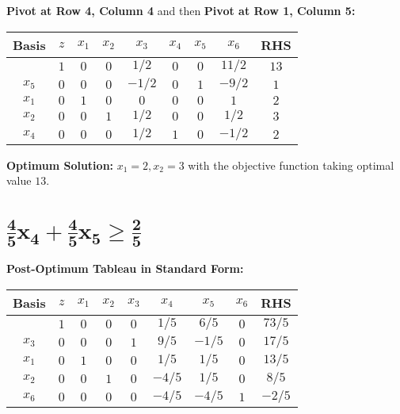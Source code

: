 \documentclass{article}[12pt,a4paper]
\begin{document}
\begin{enumerate}
  	  \noindent \textbf{Pivot at Row 4, Column 4} and then \textbf{Pivot at Row 1, Column 5:}
  	   \begin{center}
 	   \begin{tabular}{c | c | c c c c c c | c}
            		Basis & $z$ & $x_1$ & $x_2$ & $x_3$ & $x_4$ & $x_5$ & $x_6$ & RHS \\ \hline
  			           & $1$ & $0$ & $0$   & $1/2$ & $0$     & $0$ & $11/2$ & $13$  \\ \hline
  			$x_5$ & $0$ & $0$ & $0$   & $-1/2$    & $0$  & $1$ & $-9/2$ & $1$ \\
  			$x_1$ & $0$ & $1$ & $0$  &  $0$    & $0$  & $0$ & $1$ & $2$ \\
  			$x_2$ & $0$ & $0$ & $1$ &   $1/2$    & $0$ & $0$ & $1/2$ & $3$ \\
  			$x_4$ & $0$ & $0$ & $0$ &   $1/2$    & $1$ & $0$ & $-1/2$ & $2$ \\
  	  \end{tabular}
  	  \end{center}
  	  
  	  \noindent \textbf{Optimum Solution:} $x_1 = 2, x_2 = 3$ with the objective function taking optimal value $13$. 
  	  
  	  \noindent \section*{$\mathbf{\frac{4}{5}x_4 + \frac{4}{5}x_5 \ge \frac{2}{5}}$}
  	  
  	  \textbf{Post-Optimum Tableau in Standard Form:}
  	  \begin{center}
 	   \begin{tabular}{c | c | c c c c c c | c}
            		Basis & $z$ & $x_1$ & $x_2$ & $x_3$ & $x_4$ & $x_5$ & $x_6$ & RHS \\ \hline
  			           & $1$ & $0$ & $0$   & $0$ & $1/5$     & $6/5$ & $0$ & $73/5$  \\ \hline
  			$x_3$ & $0$ & $0$ & $0$   & $1$    & $9/5$  & $-1/5$ & $0$ & $17/5$ \\
  			$x_1$ & $0$ & $1$ & $0$  &  $0$    & $1/5$  & $1/5$ & $0$ & $13/5$ \\
  			$x_2$ & $0$ & $0$ & $1$ &   $0$    & $-4/5$ & $1/5$ & $0$ & $8/5$ \\
  			$x_6$ & $0$ & $0$ & $0$ &   $0$    & $-4/5$ & $-4/5$ & $1$ & $-2/5$ \\
  	  \end{tabular}
  	  \end{center}
  	  

\end{enumerate}
\end{document}
